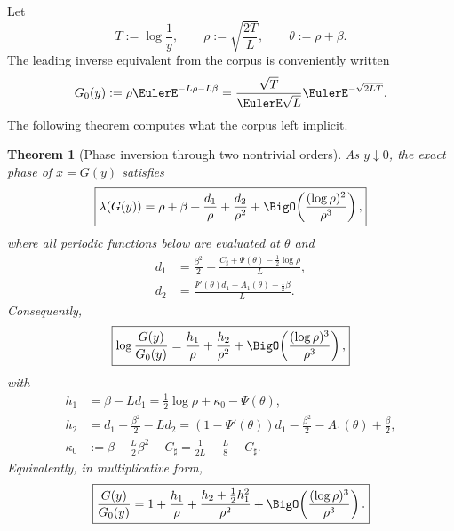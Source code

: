 \documentclass[11pt,oneside]{article}
\numberwithin{equation}{section}
\newtheorem{theorem}{Theorem}[section]
\theoremstyle{definition}
\theoremstyle{remark}
\begin{document}
Let
\begin{equation}
 T:=\log\frac1y,
 \qquad
 \rho:=\sqrt{\frac{2T}{L}},
 \qquad
 \theta:=\rho+\beta.
 \label{p1:eq:T-rho-theta}
\end{equation}
The leading inverse equivalent from the corpus is conveniently written
\begin{equation}
 G_0(y):=\rho\EulerE^{-L\rho-L\beta}
 =\frac{\sqrt T}{\EulerE\sqrt L}\EulerE^{-\sqrt{2LT}}.
 \label{p1:eq:G0}
\end{equation}
The following theorem computes what the corpus left implicit.

\begin{theorem}[Phase inversion through two nontrivial orders]
\label{p1:thm:phase-two-orders}
As $y\downarrow0$, the exact phase of $x=G(y)$ satisfies
\begin{equation}
 \boxed{
 \lambda(G(y))=
 \rho+\beta+\frac{d_1}{\rho}+\frac{d_2}{\rho^2}
 +\BigO\!\left(\frac{(\log\rho)^2}{\rho^3}\right),}
 \label{p1:eq:lambda-inverse-two-orders}
\end{equation}
where all periodic functions below are evaluated at $\theta$ and
\begin{align}
 d_1&=\frac{\beta^2}{2}
 +\frac{C_{\sharp}+\Psi(\theta)-\tfrac12\log\rho}{L},
 \label{p1:eq:d1-endpoint}\\
 d_2&=\frac{\Psi'(\theta)d_1+A_1(\theta)-\tfrac12\beta}{L}.
 \label{p1:eq:d2-endpoint}
\end{align}
Consequently,
\begin{equation}
 \boxed{
 \log\frac{G(y)}{G_0(y)}
 =\frac{h_1}{\rho}+\frac{h_2}{\rho^2}
 +\BigO\!\left(\frac{(\log\rho)^3}{\rho^3}\right),}
 \label{p1:eq:log-inverse-two-orders}
\end{equation}
with
\begin{align}
 h_1&=\beta-Ld_1
 =\frac12\log\rho+\kappa_0-\Psi(\theta),
 \label{p1:eq:h1}\\
 h_2&=d_1-\frac{\beta^2}{2}-Ld_2
 =(1-\Psi'(\theta))d_1-\frac{\beta^2}{2}
   -A_1(\theta)+\frac\beta2,
 \label{p1:eq:h2}\\
 \kappa_0&:=\beta-\frac L2\beta^2-C_{\sharp}
 =\frac1{2L}-\frac L8-C_{\sharp}.
 \label{p1:eq:kappa0}
\end{align}
Equivalently, in multiplicative form,
\begin{equation}
 \boxed{
 \frac{G(y)}{G_0(y)}
 =1+\frac{h_1}{\rho}
 +\frac{h_2+\tfrac12h_1^2}{\rho^2}
 +\BigO\!\left(\frac{(\log\rho)^3}{\rho^3}\right).}
 \label{p1:eq:inverse-multiplicative-two-orders}
\end{equation}
\end{theorem}
\end{document}
